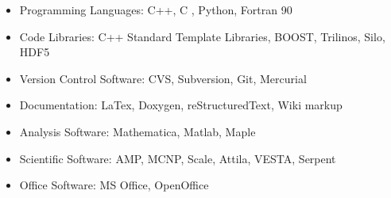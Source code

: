 \documentclass[letterpaper,11pt]{article}
\begin{document}
\begin{itemize}
  \item Programming Languages: C++, C , Python, Fortran 90
  \item Code Libraries: C++ Standard Template Libraries, BOOST,
    Trilinos, Silo, HDF5 
  \item Version Control Software: CVS, Subversion, Git, Mercurial
  \item Documentation: LaTex, Doxygen, reStructuredText, Wiki markup
  \item Analysis Software: Mathematica, Matlab, Maple
  \item Scientific Software: AMP, MCNP, Scale, Attila, VESTA, Serpent
  \item Office Software: MS Office, OpenOffice
\end{itemize}

\end{document}
